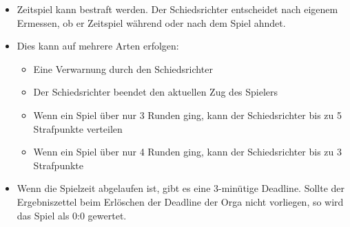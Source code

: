 \begin{itemize}

 \item Zeitspiel kann bestraft werden. Der Schiedsrichter entscheidet nach
  eigenem Ermessen, ob er Zeitspiel während oder nach dem Spiel ahndet.

\item Dies kann auf mehrere Arten erfolgen:
\begin{itemize}
 \item Eine Verwarnung durch den Schiedsrichter
 \item Der Schiedsrichter beendet den aktuellen Zug des Spielers
 \item Wenn ein Spiel über nur 3 Runden ging, kann der Schiedsrichter bis zu 5
  Strafpunkte verteilen
 \item Wenn ein Spiel über nur 4 Runden ging, kann der Schiedsrichter bis zu 3
  Strafpunkte
\end{itemize}

\item Wenn die Spielzeit abgelaufen ist, gibt es eine 3-minütige Deadline.
 Sollte der Ergebniszettel beim Erlöschen der Deadline der Orga nicht vorliegen,
 so wird das Spiel als 0:0 gewertet.

\end{itemize}


